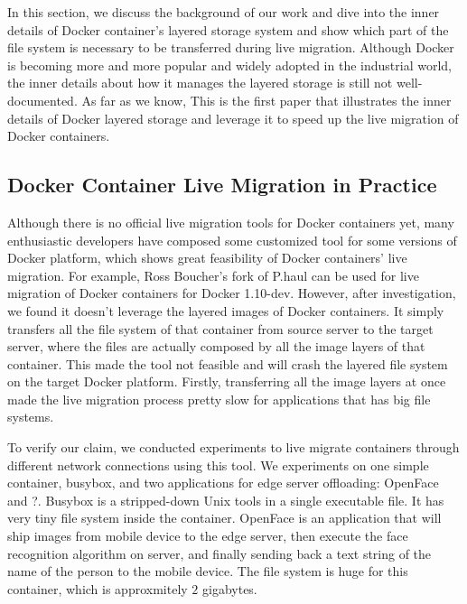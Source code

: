 
In this section, we discuss the background of our work and dive into the inner details of Docker container's layered storage system and show which part of the file system is necessary to be transferred during live migration. 
Although Docker is becoming more and more popular and widely adopted in the industrial world, the inner details about how it manages the layered storage is still not well-documented. As far as we know, This is the first paper that illustrates the inner details of Docker layered storage and leverage it to speed up the live migration of Docker containers.






\subsection{Docker Container Live Migration in Practice }\label{migpractice}

Although there is no official live migration tools for Docker containers yet, many enthusiastic developers have composed some customized tool for some versions of Docker platform, which shows great feasibility of Docker containers' live migration. For example, Ross Boucher's fork \cite{boucherPhaul} of P.haul
can be used for live migration of Docker containers for Docker 1.10-dev. However, after investigation, we found it doesn't leverage the layered images of Docker containers. It simply transfers all the file system of that container from source server to the target server, where the files are actually composed by all the image layers of that container. This made the tool not feasible and will crash the layered file system on the target Docker platform. Firstly, transferring all the image layers at once made the live migration process pretty slow for applications that has big file systems. 

To verify our claim, we conducted experiments to live migrate containers through different network connections using this tool. We experiments on one simple container, busybox, and two applications for edge server offloading: OpenFace and ?.  Busybox is a stripped-down Unix tools in a single executable file. It has very tiny file system inside the container. OpenFace\cite{openface2016} is an application that will ship images from mobile device to the edge server, then execute the face recognition algorithm on server, and finally sending back a text string of the name of the person to the mobile device. The file system is huge for this container, which is approxmitely $2$ gigabytes.

